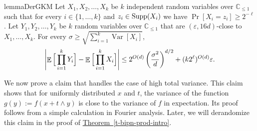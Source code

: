 \documentclass[11pt]{article}
\numberwithin{equation}{section}
\theoremstyle{definition}
\theoremstyle{plain}
\newcommand{\C}{\mathbb C}
\newcommand{\expref}[2]{\hyperref[#2]{#1~\ref{#2}}}
\def\eps{\varepsilon}
\def\Blocklength{\ell}
\def\Supp{\textnormal{Supp}}
\DeclarePairedDelimiter{\abs}{\lvert}{\rvert}
\DeclareMathOperator*{\E}{\mathbb{E}}                 %
\DeclareMathOperator*{\Var}{Var}                 %
\begin{document}
  \begin{restatable}{lemma}{DerGKM} \label{lemma-GKM-Der}
    Let $X_1, X_2, \ldots, X_k$ be $k$ independent random variables over $\C_{\le 1}$ such that for every $i \in \{1, \ldots, k\}$ and $z_i \in \Supp(X_i)$ we have $\Pr[X_i = z_i] \ge 2^{-\Blocklength}$.
    Let $Y_1, Y_2, \ldots, Y_k$ be $k$ random variables over $\C_{\le 1}$ that are $(\eps, 16d)$-close to $X_1, \ldots, X_k$.
    For every $\sigma \ge \sqrt{\sum_{i=1}^k \Var[X_i]}$, 
    \[
      \abs*{ \E \Big[ \prod_{i=1}^k Y_i \Big] - \E \Big[ \prod_{i=1}^k X_i \Big] }
      \le 2^{O(d)} \left( \frac{\sigma^2}{d} \right)^{d/2} + (k 2^\Blocklength)^{O(d)} \eps.
    \]
  \end{restatable}

  We now prove a claim that handles the case of high total variance.
  This claim shows that for uniformly distributed $x$ and $t$, the variance of
  the function $g(y) := f(x + t \wedge y)$ is close to the variance of $f$ in expectation.
  Its proof follows from a simple calculation in Fourier analysis.
  Later, we will derandomize this claim in the proof of \expref{Theorem}{t-bipn-prod-intro}.
\end{document}
